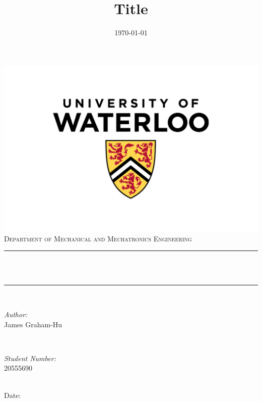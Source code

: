 \documentclass[letterpaper,12pt]{article}
\title{Title}
\author{}
\date{\today}											%
\makeatletter
\let\thetitle\@title
\let\thedate\@date
\makeatother
\begin{document}
\begin{titlepage}
	\centering
    \vspace*{-1 cm}
    \includegraphics[scale = 0.5]{UW.jpg}\\	%
    \textsc{\Large Department of Mechanical and Mechatronics Engineering}\\[2.0 cm]
	\rule{\linewidth}{0.2 mm} \\[0.4 cm]
	{ \huge \bfseries \thetitle}\\
	\rule{\linewidth}{0.2 mm} \\[1.5 cm]

	\begin{minipage}[t]{0.4\textwidth}
		\begin{flushleft} \large
			\emph{Author:}\\
            James Graham-Hu \\
			\end{flushleft}
			\end{minipage}~
			\begin{minipage}[t]{0.4\textwidth}
			\begin{flushright} \large
			\emph{Student Number:} \\
				20555690 \\
		\end{flushright}
	\end{minipage}\\[2 cm]
	Date:
	{\large \thedate}\\[2 cm]
	\vfill

\end{titlepage}
\thispagestyle{empty}
\thedate\\
\end{document}
